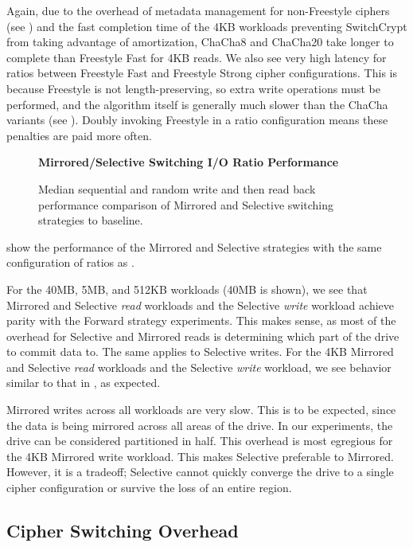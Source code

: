 Again, due to the overhead of metadata management for non-Freestyle ciphers (see
) and the fast completion time of the 4KB workloads
preventing SwitchCrypt from taking advantage of amortization, ChaCha8 and
ChaCha20 take longer to complete than Freestyle Fast for 4KB reads. We also see
very high latency for ratios between Freestyle Fast and Freestyle Strong cipher
configurations. This is because Freestyle is not length-preserving, so extra
write operations must be performed, and the algorithm itself is generally much
slower than the ChaCha variants (see ). Doubly
invoking Freestyle in a ratio configuration means these penalties are paid more
often.

\begin{figure}[ht]
  \textbf{Mirrored/Selective Switching I/O Ratio Performance}\par\medskip
  \centering
  {} \caption{Median sequential and
  random write and then read back performance comparison of Mirrored and
  Selective switching strategies to baseline.}
 \label{fig:mirrored-selective-baseline}
\end{figure}

 show the performance of the Mirrored and
Selective strategies with the same configuration of ratios as
.

For the 40MB, 5MB, and 512KB workloads (40MB is shown), we see that Mirrored and
Selective \emph{read} workloads and the Selective \emph{write} workload achieve
parity with the Forward strategy experiments. This makes sense, as most of the
overhead for Selective and Mirrored reads is determining which part of the drive
to commit data to. The same applies to Selective writes. For the 4KB Mirrored
and Selective \emph{read} workloads and the Selective \emph{write} workload, we
see behavior similar to that in , as expected.

Mirrored writes across all workloads are very slow. This is to be expected,
since the data is being mirrored across all areas of the drive. In our
experiments, the drive can be considered partitioned in half. This overhead is
most egregious for the 4KB Mirrored write workload. This makes Selective
preferable to Mirrored. However, it is a tradeoff; Selective cannot quickly
converge the drive to a single cipher configuration or survive the loss of an
entire region.

\subsection{Cipher Switching Overhead} \label{subsec:3}

